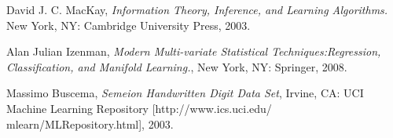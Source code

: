 \begin{thebibliography}{1}

David J. C. MacKay, \emph{Information Theory, Inference, and Learning Algorithms.} New York, NY: Cambridge University Press, 2003.

Alan Julian Izenman, \emph{Modern Multi-variate Statistical Techniques:Regression, Classification, and Manifold Learning.}, New York, NY: Springer, 2008.

Massimo Buscema, \emph{Semeion Handwritten Digit Data Set}, Irvine, CA: UCI Machine Learning Repository [http://www.ics.uci.edu/ mlearn/MLRepository.html], 2003.

\end{thebibliography}